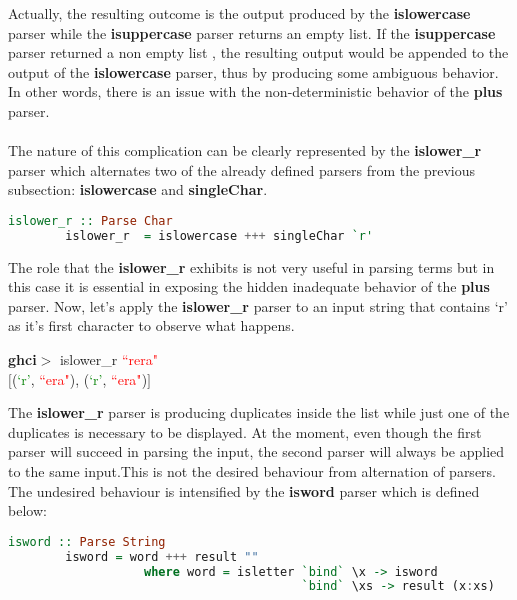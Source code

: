 \documentclass[a4paper, onecolumn]{article}
\begin{document}
    \noindent Actually, the resulting outcome is the output produced by the \textbf{islowercase} parser while the \textbf{isuppercase} parser returns an empty list. If the \textbf{isuppercase} parser returned a non empty list , the resulting output would be appended to the output of the \textbf{islowercase} parser, thus by producing some ambiguous behavior. In other words, there is an issue with the non-deterministic behavior of the \textbf{plus} parser. \\ \\
    The nature of this complication can be clearly represented by the \textbf{islower\_r} parser which alternates two of the already defined parsers from the previous subsection: \textbf{islowercase} and \textbf{singleChar}. 
    
    \begin{tcolorbox}
    \begin{lstlisting}[language=Haskell] 
        islower_r :: Parse Char
        islower_r  = islowercase +++ singleChar `r'
    \end{lstlisting}
    \end{tcolorbox}
    
    \noindent The role that the \textbf{islower\_r} exhibits is not very useful in parsing terms but in this case it is essential in exposing the hidden inadequate behavior of the \textbf{plus} parser. Now, let's apply the \textbf{islower\_r} parser to an input string that contains `r' as it's first character to observe what happens.
    
    \begin{center}
            \textbf{ghci$>$} islower\_r \textcolor{red}{``rera"} \\
            $\big[$(\textcolor{green}{`r'}, \textcolor{red}{``era"}), (\textcolor{green}{`r'}, \textcolor{red}{``era"})$\big]$
        \end{center}
    
     \noindent The \textbf{islower\_r} parser is producing duplicates inside the list while just one of the duplicates is necessary to be displayed. At the moment, even though the first parser will succeed in parsing the input, the second parser will always be applied to the same input.This is not the desired behaviour from alternation of parsers. The undesired behaviour is intensified by the \textbf{isword} parser which is defined below:
     
    \begin{tcolorbox}
    \begin{lstlisting}[language=Haskell] 
        isword :: Parse String
        isword = word +++ result ""
                   where word = isletter `bind` \x -> isword 
                                         `bind` \xs -> result (x:xs)
    \end{lstlisting}
    \end{tcolorbox}
    
\end{document}
